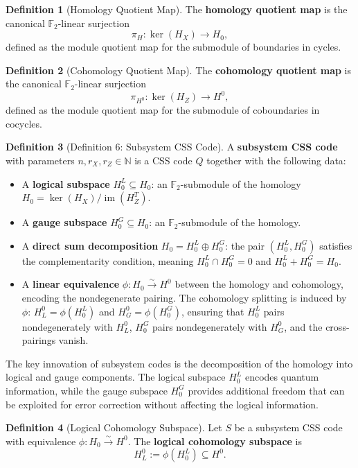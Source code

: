 \documentclass[11pt]{article}
\theoremstyle{plain}
\theoremstyle{definition}
\newtheorem*{definition}{Definition}
\theoremstyle{remark}
\renewcommand{\ker}{\operatorname{ker}}
\begin{document}
\begin{definition}[Homology Quotient Map]
The \textbf{homology quotient map} is the canonical $\mathbb{F}_2$-linear surjection
\[
\pi_H : \ker(H_X) \longrightarrow H_0,
\]
defined as the module quotient map for the submodule of boundaries in cycles.
\end{definition}

\begin{definition}[Cohomology Quotient Map]
The \textbf{cohomology quotient map} is the canonical $\mathbb{F}_2$-linear surjection
\[
\pi_{H^0} : \ker(H_Z) \longrightarrow H^0,
\]
defined as the module quotient map for the submodule of coboundaries in cocycles.
\end{definition}

\begin{definition}[Definition 6: Subsystem CSS Code]
A \textbf{subsystem CSS code} with parameters $n, r_X, r_Z \in \mathbb{N}$ is a CSS code $Q$ together with the following data:
\begin{itemize}
\item A \textbf{logical subspace} $H_0^L \subseteq H_0$: an $\mathbb{F}_2$-submodule of the homology $H_0 = \ker(H_X)/\operatorname{im}(H_Z^T)$.
\item A \textbf{gauge subspace} $H_0^G \subseteq H_0$: an $\mathbb{F}_2$-submodule of the homology.
\item A \textbf{direct sum decomposition} $H_0 = H_0^L \oplus H_0^G$: the pair $(H_0^L, H_0^G)$ satisfies the complementarity condition, meaning $H_0^L \cap H_0^G = 0$ and $H_0^L + H_0^G = H_0$.
\item A \textbf{linear equivalence} $\phi : H_0 \xrightarrow{\sim} H^0$ between the homology and cohomology, encoding the nondegenerate pairing. The cohomology splitting is induced by $\phi$: $H^0_L = \phi(H_0^L)$ and $H^0_G = \phi(H_0^G)$, ensuring that $H_0^L$ pairs nondegenerately with $H^0_L$, $H_0^G$ pairs nondegenerately with $H^0_G$, and the cross-pairings vanish.
\end{itemize}
\end{definition}

The key innovation of subsystem codes is the decomposition of the homology into logical and gauge components. The logical subspace $H_0^L$ encodes quantum information, while the gauge subspace $H_0^G$ provides additional freedom that can be exploited for error correction without affecting the logical information.

\begin{definition}[Logical Cohomology Subspace]
Let $S$ be a subsystem CSS code with equivalence $\phi : H_0 \xrightarrow{\sim} H^0$. The \textbf{logical cohomology subspace} is
\[
H^0_L := \phi(H_0^L) \subseteq H^0.
\]
\end{definition}
\end{document}
